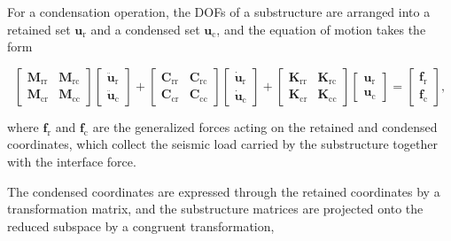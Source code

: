 \documentclass[a4paper,fleqn,review,12pt]{cas-sc}
\numberwithin{equation}{section}
\begin{document}
For a condensation operation, the DOFs of a substructure are arranged into a retained set \(\bm{u}_{\mathrm{r}}\) and a condensed set \(\bm{u}_{\mathrm{c}}\), and the equation of motion takes the form

\vspace{-3.5em}
\begin{equation}
	\begin{bmatrix}
		\mathbf{M}_{\mathrm{rr}} & \mathbf{M}_{\mathrm{rc}}\\
		\mathbf{M}_{\mathrm{cr}} & \mathbf{M}_{\mathrm{cc}}
	\end{bmatrix}
	\begin{bmatrix}
		\ddot{\bm{u}}_{\mathrm{r}}\\
		\ddot{\bm{u}}_{\mathrm{c}}
	\end{bmatrix}
	+
	\begin{bmatrix}
		\mathbf{C}_{\mathrm{rr}} & \mathbf{C}_{\mathrm{rc}}\\
		\mathbf{C}_{\mathrm{cr}} & \mathbf{C}_{\mathrm{cc}}
	\end{bmatrix}
	\begin{bmatrix}
		\dot{\bm{u}}_{\mathrm{r}}\\
		\dot{\bm{u}}_{\mathrm{c}}
	\end{bmatrix}
	+
	\begin{bmatrix}
		\mathbf{K}_{\mathrm{rr}} & \mathbf{K}_{\mathrm{rc}}\\
		\mathbf{K}_{\mathrm{cr}} & \mathbf{K}_{\mathrm{cc}}
	\end{bmatrix}
	\begin{bmatrix}
		\bm{u}_{\mathrm{r}}\\
		\bm{u}_{\mathrm{c}}
	\end{bmatrix}
	=
	\begin{bmatrix}
		\bm{f}_{\mathrm{r}}\\
		\bm{f}_{\mathrm{c}}
	\end{bmatrix},
	\label{eq:partitioned-local-eom}
\end{equation}
\vspace{-3.5em}

\noindent where \(\bm{f}_{\mathrm{r}}\) and \(\bm{f}_{\mathrm{c}}\) are the generalized forces acting on the retained and condensed coordinates, which collect the seismic load carried by the substructure together with the interface force.

The condensed coordinates are expressed through the retained coordinates by a transformation matrix, and the substructure matrices are projected onto the reduced subspace by a congruent transformation,
\end{document}
